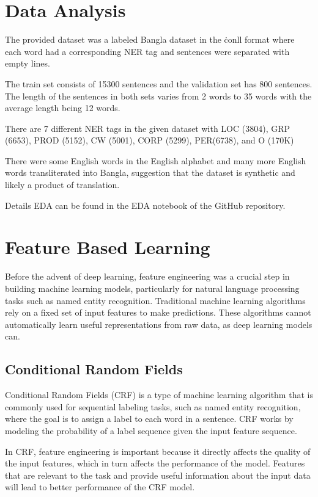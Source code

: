 \documentclass{article}
\begin{document}
\section{Data Analysis}
\label{sec:data_analysis}

The provided dataset was a labeled Bangla dataset in the \.conll format where each word had a corresponding NER tag and sentences were separated with empty lines.

The train set consists of 15300 sentences and the validation set has 800 sentences. The length of the sentences in both sets varies from 2 words to 35 words with the average length being 12 words.

There are 7 different NER tags in the given dataset with LOC (3804), GRP (6653), PROD (5152), CW (5001), CORP (5299), PER(6738), and O (170K)

There were some English words in the English alphabet and many more English words  transliterated into Bangla, suggestion that the dataset is synthetic and likely a product of translation.

Details EDA can be found in the EDA notebook of the GitHub repository.

\section{Feature Based Learning}
\label{sec:feature_based_learning}

Before the advent of deep learning, feature engineering was a crucial step in building machine learning models, particularly for natural language processing tasks such as named entity recognition. Traditional machine learning algorithms rely on a fixed set of input features to make predictions. These algorithms cannot automatically learn useful representations from raw data, as deep learning models can.

\subsection{Conditional Random Fields}

Conditional Random Fields (CRF) is a type of machine learning algorithm that is commonly used for sequential labeling tasks, such as named entity recognition, where the goal is to assign a label to each word in a sentence. \cite{ekbal2008named} CRF works by modeling the probability of a label sequence given the input feature sequence.

In CRF, feature engineering is important because it directly affects the quality of the input features, which in turn affects the performance of the model. Features that are relevant to the task and provide useful information about the input data will lead to better performance of the CRF model.
\end{document}

